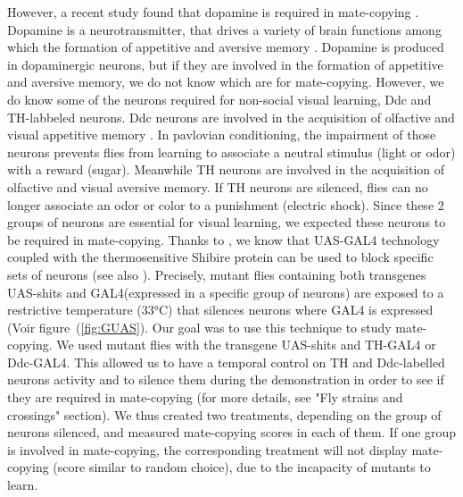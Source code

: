 \documentclass[a4paper, 12pt]{article}
\begin{document}
However, a recent study found that dopamine is required in mate-copying \parencite{monier_dopamine_2018}. Dopamine is a neurotransmitter, that drives a variety of brain functions among which the formation of appetitive and aversive memory \parencite{riemensperger_punishment_2005, sitaraman_serotonin_2008, alekseyenko_targeted_2010, berry_dopamine_2012, yamamoto_dopamine_2014}. Dopamine is produced in dopaminergic neurons, but if they are involved in the formation of appetitive and aversive memory, we do not know which are for mate-copying. However, we do know some of the neurons required for non-social visual learning, Ddc and TH-labbeled neurons. Ddc neurons are involved in the acquisition of olfactive and visual appetitive memory \parencite{liu_subset_2012, vogt_shared_2014}. In pavlovian conditioning, the impairment of those neurons prevents flies from learning to associate a neutral stimulus (light or odor) with a reward (sugar). Meanwhile TH neurons are involved in the acquisition of olfactive and visual aversive memory. If TH neurons are silenced, flies can no longer associate an odor or color to a punishment (electric shock). Since these 2 groups of neurons are essential for visual learning, we expected these neurons to be required in mate-copying.
Thanks to \textcite{kitamoto_conditional_2001}, we know that UAS-GAL4 technology coupled with the thermosensitive Shibire protein can be used to block specific sets of neurons (see also \textcite{kasuya_neuronal_2009}). Precisely, mutant flies containing both transgenes UAS-shits and GAL4(expressed in a specific group of neurons) are exposed to a restrictive temperature (33°C) that silences neurons where GAL4 is expressed (Voir figure~(\ref{fig:GUAS}). Our goal was to use this technique to study mate-copying. We used mutant flies with the transgene UAS-shits and TH-GAL4 or Ddc-GAL4. This allowed us to have a temporal control on TH and Ddc-labelled neurons activity and to silence them during the demonstration in order to see if they are required in mate-copying (for more details, see "Fly strains and crossings" section). We thus created two treatments, depending on the group of neurons silenced, and measured mate-copying scores in each of them. If one group is involved in mate-copying, the corresponding treatment will not display mate-copying (score similar to random choice), due to the incapacity of mutants to learn.
	
\end{document}
